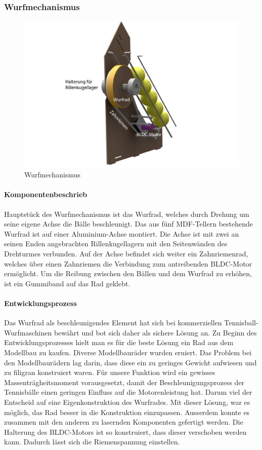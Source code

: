 \subsubsection{Wurfmechanismus}
\begin{figure}[h!]
	\centering
	\includegraphics[width=\linewidth]{../../fig/Render-Wurfmechanismusx}
	\caption{Wurfmechanismus}
	\label{fig:Wurfmechanismus}
\end{figure}
\paragraph{Komponentenbeschrieb}
Hauptstück des Wurfmechanismus ist das Wurfrad, welches durch Drehung um seine eigene Achse die Bälle beschleunigt.
Das aus fünf MDF-Tellern bestehende Wurfrad ist auf einer  Aluminium-Achse montiert. Die Achse ist mit zwei an seinen Enden angebrachten Rillenkugellagern mit den Seitenwänden des Drehturmes verbunden. Auf der Achse befindet sich weiter ein Zahnriemenrad, welches über einen Zahnriemen die Verbindung zum antreibenden BLDC-Motor ermöglicht.
Um die Reibung zwischen den Bällen und dem Wurfrad zu erhöhen, ist ein Gummiband auf das Rad geklebt.

\paragraph{Entwicklungsprozess}
Das Wurfrad als beschleunigendes Element hat sich bei kommerziellen Tennisball-Wurfmaschinen bewährt und bot sich daher als sichere Lösung an.
Zu Beginn des Entwicklungsprozesses hielt man es für die beste Lösung ein Rad aus dem Modellbau zu kaufen. Diverse Modellbauräder wurden eruiert. Das Problem bei den Modellbaurädern lag darin, dass diese ein zu geringes Gewicht aufwiesen und zu filigran konstruiert waren. Für unsere Funktion wird ein gewisses Massenträgheitsmoment vorausgesetzt, damit der Beschleunigungsprozess der Tennisbälle einen geringen Einfluss auf die Motorenleistung hat. Darum viel der Entscheid auf eine Eigenkonstruktion des Wurfrades. Mit dieser Lösung, war es möglich, das Rad besser in die Konstruktion einzupassen. Ausserdem konnte es zusammen mit den anderen zu lasernden Komponenten gefertigt werden. Die Halterung des BLDC-Motors ist so konstruiert, dass dieser verschoben werden kann. Dadurch lässt sich die Riemenspannung einstellen.   